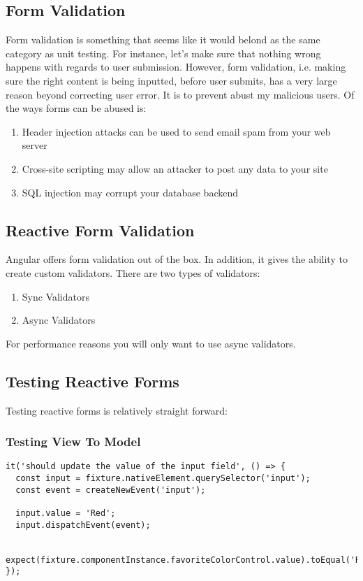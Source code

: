\subsection{Form Validation}
Form validation is something that seems like it would belond as the same 
category as unit testing. For instance, let's make sure that nothing wrong 
happens with regards to user submission. However, form validation, i.e. 
making sure the right content is being inputted, before user submits, has a 
very large reason beyond correcting user error. It is to prevent abust my 
malicious users. Of the ways forms can be abused is: 
\begin{enumerate}
  \item Header injection attacks can be used to send email spam from your web 
  server
  \item Cross-site scripting may allow an attacker to post any data to your 
  site
  \item SQL injection may corrupt your database backend
\end{enumerate}

\subsection{ Reactive Form Validation }
Angular offers form validation out of the box. In addition, it gives the
ability to create custom validators. There are two types of validators: 
\begin{enumerate}
  \item Sync Validators
  \item Async Validators
\end{enumerate}

For performance reasons you will only want to use async validators. 



\subsection{ Testing Reactive Forms }
Testing reactive forms is relatively straight forward: 

\subsubsection{ Testing View To Model }

\begin{lstlisting}[caption=Testing View to Model]
it('should update the value of the input field', () => {
  const input = fixture.nativeElement.querySelector('input');
  const event = createNewEvent('input');

  input.value = 'Red';
  input.dispatchEvent(event);

  expect(fixture.componentInstance.favoriteColorControl.value).toEqual('Red');
});
\end{lstlisting}

